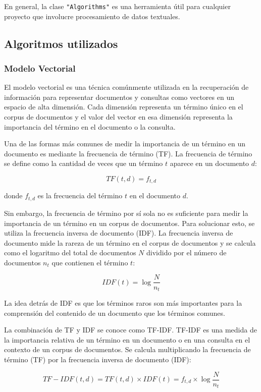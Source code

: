 \documentclass{article}
\begin{document}
En general, la clase \texttt{"Algorithms"} es una herramienta útil para cualquier proyecto que involucre procesamiento de datos textuales.

\subsection{Algoritmos utilizados}

\subsubsection{Modelo Vectorial}

El modelo vectorial es una técnica comúnmente utilizada en la recuperación de información para representar documentos y consultas como vectores en un espacio de alta dimensión. Cada dimensión representa un término único en el corpus de documentos y el valor del vector en esa dimensión representa la importancia del término en el documento o la consulta.

Una de las formas más comunes de medir la importancia de un término en un documento es mediante la frecuencia de término (TF). La frecuencia de término se define como la cantidad de veces que un término $t$ aparece en un documento $d$:

$$TF(t,d) = f_{t,d}$$

donde $f_{t,d}$ es la frecuencia del término $t$ en el documento $d$.

Sin embargo, la frecuencia de término por sí sola no es suficiente para medir la importancia de un término en un corpus de documentos. Para solucionar esto, se utiliza la frecuencia inversa de documento (IDF). La frecuencia inversa de documento mide la rareza de un término en el corpus de documentos y se calcula como el logaritmo del total de documentos $N$ dividido por el número de documentos $n_t$ que contienen el término $t$:

$$IDF(t) = \log{\frac{N}{n_t}}$$

La idea detrás de IDF es que los términos raros son más importantes para la comprensión del contenido de un documento que los términos comunes.

La combinación de TF y IDF se conoce como TF-IDF. TF-IDF es una medida de la importancia relativa de un término en un documento o en una consulta en el contexto de un corpus de documentos. Se calcula multiplicando la frecuencia de término (TF) por la frecuencia inversa de documento (IDF):

$$TF-IDF(t,d) = TF(t,d) \times IDF(t) = f_{t,d} \times \log{\frac{N}{n_t}}$$
\end{document}
